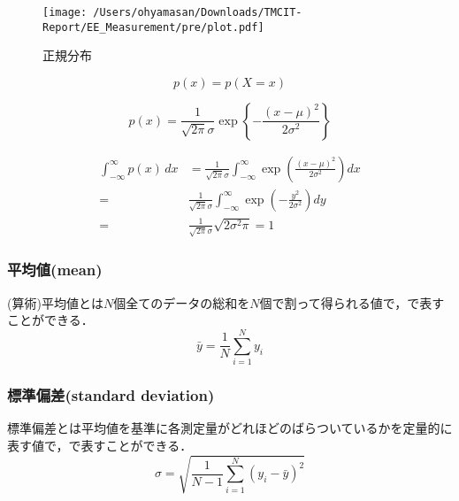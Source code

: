 \begin{figure}
\centering
\texttt{[image: /Users/ohyamasan/Downloads/TMCIT-Report/EE\_Measurement/pre/plot.pdf]}
\caption{正規分布}
\label{fig:normal-fig}
\end{figure}

\begin{equation}
\label{13}
p(x)=p(X=x)
\end{equation}

\begin{equation}
\label{eq:kakuritumitudo-fx}
p(x)=\frac{1}{\sqrt{2\pi}\sigma} \exp \left\{-\frac{(x-\mu)^2}{2\sigma^2}\right\}
\end{equation}

\begin{align}
\label{eq:int-nor}
\int_{-\infty}^{\infty} p(x)\,dx&=\frac{1}{\sqrt{2\pi}\sigma} \int_{-\infty}^{\infty} \exp \left(\frac{(x-\mu)^{2}}{2\sigma^{2}}\right)dx\nonumber\\
=&\frac{1}{\sqrt{2\pi}\sigma } \int_{-\infty}^{\infty} \exp \left(-\frac{y^{2}}{2\sigma^{2}}\right)dy\nonumber\\
=&\frac{1}{\sqrt{2\pi}\sigma }\sqrt{2\sigma^{2}\pi}=1
\end{align}

\subsubsection{平均値(mean)}
(算術)平均値とは$N$個全てのデータの総和を$N$個で割って得られる値で，で表すことができる\cite{1130848328216058496}．
\begin{equation}
	\bar{y} = \frac{1}{N}\sum^N_{i = 1}y_i
	\label{eq:heikinchi}
\end{equation}		

\subsubsection{標準偏差(standard deviation)\cite{1130000797042387712}}
標準偏差とは平均値を基準に各測定量がどれほどのばらついているかを定量的に表す値で，で表すことができる．
\begin{equation}
	\sigma = \sqrt{\frac{1}{N - 1}\sum^N_{i = 1}(y_i - \bar{y})^2}
	\label{eq:hyoujunhensa}
\end{equation}	

